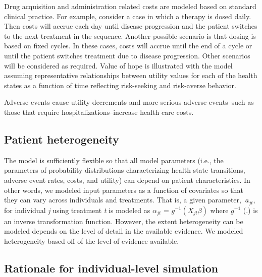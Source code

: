 \documentclass[11pt,final,fleqn]{article}\usepackage[]{graphicx}\usepackage[]{color}
\theoremstyle{plain}
\begin{document}
{Drug acquisition and administration related costs are modeled based on standard clinical practice. For example, consider a case in which a therapy is dosed daily. Then costs will accrue each day until disease progression and the patient switches to the next treatment in the sequence. Another possible scenario is that dosing is based on fixed cycles. In these cases, costs will accrue until the end of a cycle or until the patient switches treatment due to disease progression. Other scenarios will be considered as required. 
Value of hope is illustrated with the model assuming representative relationships between utility values for each of the health states as a function of time reflecting risk-seeking and risk-averse behavior. 

Adverse events cause utility decrements and more serious adverse events--such as those that require hospitalizations--increase health care costs. 

\subsection{Patient heterogeneity}
The model is sufficiently flexible so that all model parameters (i.e., the parameters of probability distributions characterizing health state transitions, adverse event rates, costs, and utility) can depend on patient characteristics. In other words, we modeled input parameters as a function of covariates so that they can vary across individuals and treatments. That is, a given parameter, $\ a_{jt} $, for individual \textit{j} using treatment \textit{t} is modeled as $ \alpha_{jt} $ = $ \textit{g}^{-1} (X_{jt}\beta) $ where $ \textit{g}^{-1} $ (.) is an inverse transformation function. However, the extent heterogeneity can be modeled depends on the level of detail in the available evidence. We modeled heterogeneity based off of the level of evidence available. 

\subsection{Rationale for individual-level simulation}

}
\end{document}
